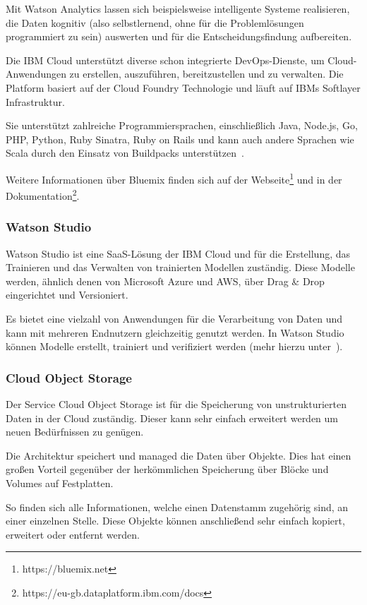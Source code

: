 Mit Watson Analytics lassen sich beispielsweise intelligente Systeme realisieren, die Daten kognitiv (also selbstlernend,
ohne für die Problemlösungen programmiert zu sein) auswerten und für die Entscheidungsfindung aufbereiten.

Die IBM Cloud unterstützt diverse schon integrierte DevOps-Dienste, um Cloud-Anwendungen zu erstellen, auszuführen,
bereitzustellen und zu verwalten. Die Platform basiert auf der Cloud Foundry Technologie und läuft auf IBMs
Softlayer Infrastruktur.

Sie unterstützt zahlreiche Programmiersprachen, einschließlich Java, Node.js, Go, PHP, Python, Ruby Sinatra, Ruby on
Rails und kann auch andere Sprachen wie Scala durch den Einsatz von Buildpacks unterstützen~\cite{book_grundlagen_bluemix}.

Weitere Informationen über Bluemix finden sich auf der Webseite\footnote{https://bluemix.net} und in der
Dokumentation\footnote{https://eu-gb.dataplatform.ibm.com/docs}.

\subsubsection{Watson Studio}
Watson Studio ist eine SaaS-Lösung der IBM Cloud und für die Erstellung, das Trainieren und das Verwalten von
trainierten Modellen zuständig. Diese Modelle werden, ähnlich denen von Microsoft Azure und AWS, über Drag \& Drop
eingerichtet und Versioniert.

Es bietet eine vielzahl von Anwendungen für die Verarbeitung von Daten und kann mit mehreren Endnutzern gleichzeitig
genutzt werden. In Watson Studio können Modelle erstellt, trainiert und verifiziert werden (mehr hierzu
unter~\cite{online_grundlagen_watson_studio}).

\subsubsection{Cloud Object Storage}
Der Service Cloud Object Storage ist für die Speicherung von unstrukturierten Daten in der Cloud zuständig. Dieser kann
sehr einfach erweitert werden um neuen Bedürfnissen zu genügen.

Die Architektur speichert und managed die Daten über Objekte. Dies hat einen großen Vorteil gegenüber der herkömmlichen
Speicherung über Blöcke und Volumes auf Festplatten.

So finden sich alle Informationen, welche einen Datenstamm zugehörig sind, an einer einzelnen Stelle. Diese Objekte
können anschließend sehr einfach kopiert, erweitert oder entfernt werden.

